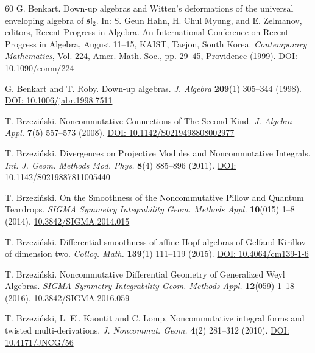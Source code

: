 \documentclass{amsart}
\theoremstyle{definition}
\theoremstyle{remark}
\numberwithin{equation}{section}
\begin{document}
\begin{thebibliography}{60}
 G. Benkart. Down-up algebras and Witten's deformations of the universal enveloping algebra of $\mathfrak{sl}_2$. In: S. Geun Hahn, H. Chul Myung, and E. Zelmanov, editors, Recent Progress in Algebra. An International Conference on Recent Progress in Algebra, August
11--15, KAIST, Taejon, South Korea. {\em Contemporary Mathematics}, Vol. 224, Amer. Math. Soc., pp. 29--45, Providence (1999). \href{https://doi.org/10.1090/conm/224}{DOI: 10.1090/conm/224}

 G. Benkart and T. Roby. Down-up algebras. {\em J. Algebra} {\bf 209}(1) 305--344 (1998). \href{https://doi.org/10.1006/jabr.1998.7511}{DOI: 10.1006/jabr.1998.7511}

 T. Brzezi{\'n}ski. Noncommutative Connections of The Second Kind. {\em J. Algebra Appl.} {\bf 7}(5) 557--573 (2008). \href{https://doi.org/10.1142/S0219498808002977}{DOI: 10.1142/S0219498808002977}

 T. Brzezi{\'n}ski. Divergences on Projective Modules and Noncommutative Integrals. {\em Int. J. Geom. Methods Mod. Phys.} {\bf 8}(4) 885--896 (2011). \href{https://doi.org/10.1142/S0219887811005440}{DOI: 10.1142/S0219887811005440}

 T. Brzezi{\'n}ski. On the Smoothness of the Noncommutative Pillow and Quantum Teardrops. {\em SIGMA Symmetry Integrability Geom. Methods Appl.} {\bf 10}(015) 1--8 (2014). \linebreak \href{http://dx.doi.org/10.3842/SIGMA.2014.015}{10.3842/SIGMA.2014.015}

 T. Brzezi{\'n}ski. Differential smoothness of affine Hopf algebras of Gelfand-Kirillov of dimension two. {\em Colloq. Math.} {\bf 139}(1) 111--119 (2015). \href{https://www.impan.pl/en/publishing-house/journals-and-series/colloquium-mathematicum/all/139/1/87553/differential-smoothness-of-affine-hopf-algebras-of-gelfand-8211-kirillov-dimension-two}{DOI: 10.4064/cm139-1-6}

T. Brzezi\'nski. Noncommutative Differential Geometry of Generalized Weyl Algebras. {\em SIGMA Symmetry Integrability Geom. Methods Appl.} {\bf 12}(059) 1--18 (2016). \href{ http://dx.doi.org/10.3842/SIGMA.2016.059}{10.3842/SIGMA.2016.059}

 T. Brzezi{\'n}ski, L. El. Kaoutit and C. Lomp, Noncommutative integral forms and twisted multi-derivations. {\em J. Noncommut. Geom.} {\bf 4}(2) 281--312 (2010). \href{https://doi.org/10.4171/JNCG/56}{DOI: 10.4171/JNCG/56}


\end{thebibliography}
\end{document}
